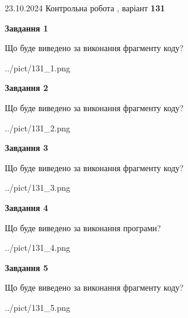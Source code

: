 \documentclass[12pt, ukrainian]{article}
\begin{document}
{\Large{23.10.2024 Контрольна робота , варіант  \No \textbf { 131 }\par}}
{
\begin {large}
{\begin {center}\textbf{Завдання 1}\end {center}}

Що буде виведено за виконання фрагменту коду?\par
\begin{center}
	{../pict/131_1.png}
\end{center}
\newpage

{\begin {center}\textbf{Завдання 2}\end {center}}

Що буде виведено за виконання фрагменту коду?\par
\begin{center}
	{../pict/131_2.png}
\end{center}
\newpage

{\begin {center}\textbf{Завдання 3}\end {center}}

Що буде виведено за виконання фрагменту коду?\par
\begin{center}
	{../pict/131_3.png}
\end{center}
\newpage

{\begin {center}\textbf{Завдання 4}\end {center}}

Що буде виведено за виконання програми?\par
\begin{center}
	{../pict/131_4.png}
\end{center}
\newpage

{\begin {center}\textbf{Завдання 5}\end {center}}

Що буде виведено за виконання фрагменту коду?\par
\begin{center}
	{../pict/131_5.png}
\end{center}
\newpage


\end{large}}
\end{document}
